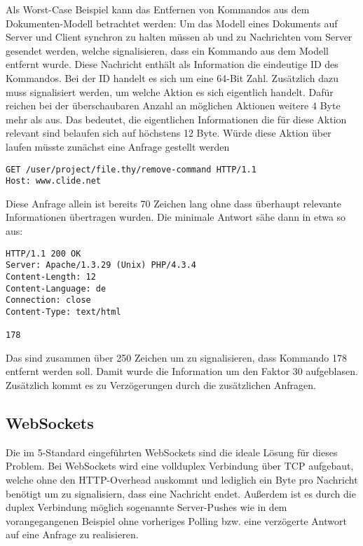 Als Worst-Case Beispiel kann das Entfernen von Kommandos aus dem Dokumenten-Modell betrachtet
werden: Um das Modell eines Dokuments auf Server und Client synchron zu halten müssen ab und zu
Nachrichten vom Server gesendet werden, welche signalisieren, dass ein Kommando aus dem Modell
entfernt wurde. Diese Nachricht enthält als Information die eindeutige ID des Kommandos. Bei der ID
handelt es sich um eine 64-Bit Zahl. Zusätzlich dazu muss signalisiert werden, um welche Aktion es
sich eigentlich handelt. Dafür reichen bei der überschaubaren Anzahl an möglichen Aktionen weitere 4
Byte mehr als aus. Das bedeutet, die eigentlichen Informationen die für diese Aktion relevant sind
belaufen sich auf höchstens 12 Byte. Würde diese Aktion über  laufen müsste zunächst eine
Anfrage gestellt werden

\begin{lstlisting}
GET /user/project/file.thy/remove-command HTTP/1.1
Host: www.clide.net
\end{lstlisting}

Diese Anfrage allein ist bereits 70 Zeichen lang ohne dass überhaupt relevante Informationen
übertragen wurden. Die minimale Antwort sähe dann in etwa so aus:

\begin{lstlisting}
HTTP/1.1 200 OK
Server: Apache/1.3.29 (Unix) PHP/4.3.4
Content-Length: 12
Content-Language: de
Connection: close
Content-Type: text/html

178
\end{lstlisting}

Das sind zusammen über 250 Zeichen um zu signalisieren, dass Kommando 178 entfernt werden soll.
Damit wurde die Information um den Faktor 30 aufgeblasen. Zusätzlich kommt es zu Verzögerungen durch
die zusätzlichen Anfragen. 

\subsection{WebSockets}
\label{sec:ws}

Die im 5-Standard eingeführten WebSockets sind die ideale Lösung für dieses Problem. Bei
WebSockets wird eine vollduplex Verbindung über TCP aufgebaut, welche ohne den HTTP-Overhead
auskommt und lediglich ein Byte pro Nachricht benötigt um zu signalisiern, dass eine Nachricht
endet. Außerdem ist es durch die duplex Verbindung möglich sogenannte Server-Pushes wie in dem
vorangegangenen Beispiel ohne vorheriges Polling bzw. eine verzögerte Antwort auf eine Anfrage zu
realisieren.

